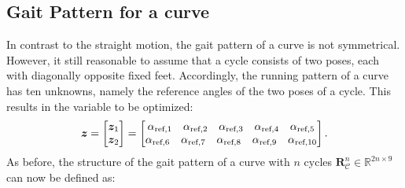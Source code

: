 \documentclass[10pt,a4paper]{article}
\begin{document}
\subsection{Gait Pattern for a curve}

In contrast to the straight motion, the gait pattern of a curve is not symmetrical.
However, it still reasonable to assume that a cycle consists of two poses, each with diagonally opposite fixed feet.
Accordingly, the running pattern of a curve has ten unknowns, namely the reference angles of the two poses of a cycle.
This results in the variable to be optimized:
\begin{equation}
\bm{z} = 
\begin{bmatrix}
\bm{z}_1 \\ \bm{z}_2
\end{bmatrix}
=
\begin{bmatrix}
\begin{matrix}
\alpha_{\textnormal{ref},1}& \alpha_{\textnormal{ref},2}&\alpha_{\textnormal{ref},3}&\alpha_{\textnormal{ref},4}&\alpha_{\textnormal{ref},5}
\end{matrix}
 \\
\begin{matrix}
\alpha_{\textnormal{ref},6}& \alpha_{\textnormal{ref},7}&\alpha_{\textnormal{ref},8}&\alpha_{\textnormal{ref},9}&\alpha_{\textnormal{ref},10}
\end{matrix}
\end{bmatrix} .
\end{equation}
As before, the structure of the gait pattern of a curve with $n$ cycles $\bm{R}_\mathcal{C}^n \in \mathbb{R}^{2n\times 9}$ can now be defined as:
\end{document}
